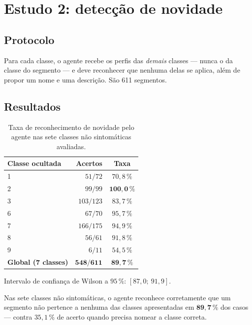 \section{Estudo 2: detecção de novidade}

\subsection{Protocolo}

Para cada classe, o agente recebe os perfis das \emph{demais} classes --- nunca o da
classe do segmento --- e deve reconhecer que nenhuma delas se aplica, além de propor um
nome e uma descrição. São 611 segmentos.

\subsection{Resultados}

\begin{table}[htbp]
\centering
\caption{Taxa de reconhecimento de novidade pelo agente nas sete classes não
sintomáticas avaliadas.}
\label{tab:ag-novidade}
\small
\begin{tabular}{lrc}
\toprule
\textbf{Classe ocultada} & \textbf{Acertos} & \textbf{Taxa} \\
\midrule
1 & $51/72$   & $70{,}8\,\%$ \\
2 & $99/99$   & $\bm{100{,}0\,\%}$ \\
3 & $103/123$ & $83{,}7\,\%$ \\
6 & $67/70$   & $95{,}7\,\%$ \\
7 & $166/175$ & $94{,}9\,\%$ \\
8 & $56/61$   & $91{,}8\,\%$ \\
9 & $6/11$    & $54{,}5\,\%$ \\
\midrule
\textbf{Global (7 classes)} & $\bm{548/611}$ & $\bm{89{,}7\,\%}$ \\
\bottomrule
\end{tabular}
\end{table}

Intervalo de confiança de Wilson a $95\,\%$: $[87{,}0;\ 91{,}9]$.

\begin{resultadochave}
Nas sete classes não sintomáticas, o agente reconhece corretamente que um segmento não
pertence a nenhuma das classes apresentadas em $\bm{89{,}7\,\%}$ dos casos --- contra
$35{,}1\,\%$ de acerto quando
precisa nomear a classe correta.
\end{resultadochave}

